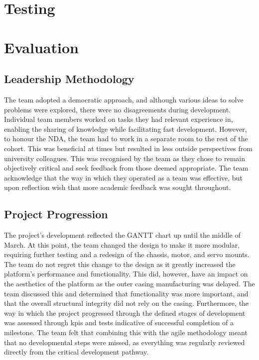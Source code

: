 \documentclass [12pt]{article}
\begin{document}
\newpage
\section{Testing}

\newpage
\section{Evaluation}

\subsection{Leadership Methodology}
The team adopted a democratic approach, and although various ideas to solve problems were explored, there were no disagreements during development. Individual team members worked on tasks they had relevant experience in, enabling the sharing of knowledge while facilitating fast development. However, to honour the NDA, the team had to work in a separate room to the rest of the cohort. This was beneficial at times but resulted in less outside perspectives from university colleagues. This was recognised by the team as they chose to remain objectively critical and seek feedback from those deemed appropriate. The team acknowledge that the way in which they operated as a team was effective, but upon reflection wish that more academic feedback was sought throughout.

\subsection{Project Progression}
The project’s development reflected the GANTT chart up until the middle of March. At this point, the team changed the design to make it more modular, requiring further testing and a redesign of the chassis, motor, and servo mounts. The team do not regret this change to the design as it greatly increased the platform’s performance and functionality. This did, however, have an impact on the aesthetics of the platform as the outer casing manufacturing was delayed.  The team discussed this and determined that functionality was more important, and that the overall structural integrity did not rely on the casing. Furthermore, the way in which the project progressed through the defined stages of development was assessed through \gls{kpi}s and tests indicative of successful completion of a milestone. The team felt that combining this with the agile methodology meant that no developmental steps were missed, as everything was regularly reviewed directly from the critical development pathway.
\end{document}
